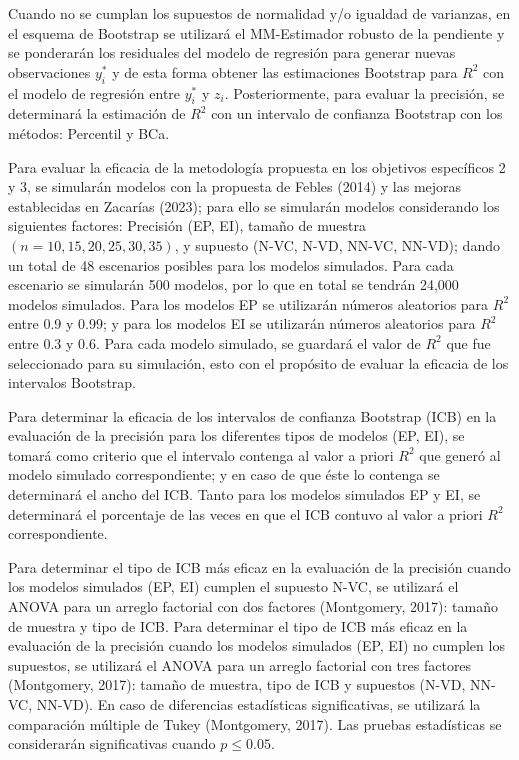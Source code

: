 Cuando no se cumplan los supuestos de normalidad y/o igualdad de varianzas, en el esquema de Bootstrap se utilizará el MM-Estimador robusto de la pendiente y se ponderarán los residuales del modelo de regresión para generar nuevas observaciones $ y_{i}^{*} $ y de esta forma obtener las estimaciones Bootstrap para $R^{2}$ con el modelo de regresión entre $ y_{i}^{*} $  y  $ z_{i} $. Posteriormente,
para evaluar la precisión, se determinará la estimación de $R^{2}$ con un intervalo de confianza Bootstrap con los métodos:  Percentil y BCa.
\vspace{.5cm}


Para evaluar la eficacia de la metodología propuesta en los objetivos específicos 2 y 3, se simularán modelos con la propuesta de Febles (2014) y las mejoras establecidas en Zacarías (2023); para ello se simularán modelos considerando los siguientes factores: Precisión (EP, EI), tamaño de muestra $(n=10,15,20,25,30,35)$, y supuesto (N-VC, N-VD, NN-VC, NN-VD); dando un total de 48 escenarios posibles para los modelos simulados. Para cada escenario se simularán 500 modelos, por lo que en total se tendrán 24,000 modelos simulados. Para los modelos EP se utilizarán números aleatorios para $R^{2}$  entre 0.9 y 0.99; y para los modelos EI se utilizarán números aleatorios para  $R^{2}$   entre 0.3 y 0.6. Para cada modelo simulado, se guardará el valor de $R^{2}$  que fue seleccionado para su simulación, esto con el propósito de evaluar la eficacia de los intervalos Bootstrap.
\vspace{.5cm}


Para determinar la eficacia de los intervalos de confianza Bootstrap (ICB) en la evaluación de la precisión para los diferentes tipos de modelos (EP, EI), se tomará como criterio que el intervalo contenga al valor a priori $R^{2}$ que generó al modelo simulado correspondiente; y en caso de que éste lo contenga se determinará el ancho del ICB. Tanto para los modelos simulados EP y EI, se determinará el porcentaje de las veces en que el ICB contuvo al valor a priori $R^{2}$ correspondiente.
\vspace{.5cm}

Para determinar el tipo de ICB más eficaz en la evaluación de la precisión cuando los modelos simulados (EP, EI) cumplen el supuesto N-VC, se utilizará el ANOVA para un arreglo factorial con dos factores (Montgomery, 2017): tamaño de muestra y tipo de ICB.
Para determinar el tipo de ICB más eficaz en la evaluación de la precisión cuando los modelos simulados (EP, EI) no cumplen los supuestos, se utilizará el ANOVA para un arreglo factorial con tres factores (Montgomery, 2017): tamaño de muestra, tipo de ICB y supuestos (N-VD, NN-VC, NN-VD).
En caso de diferencias estadísticas significativas, se utilizará la comparación múltiple de Tukey (Montgomery, 2017).
Las pruebas estadísticas se considerarán significativas cuando $p \leq 0.05 $.
\vspace{.5cm}

